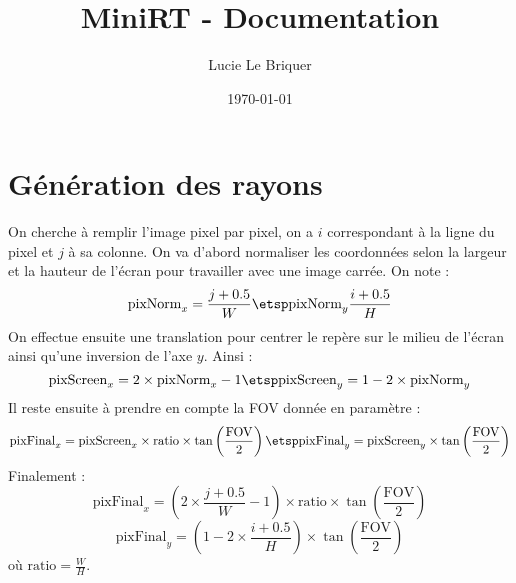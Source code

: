 

\title{\LARGE \textbf{MiniRT} - Documentation}
\author{\large Lucie Le Briquer}
\date{\today}


\maketitle
\tableofcontents
\newpage\section{Génération des rayons}
\begin{center}
\hspace{1cm}
\end{center}
\dd\ni On cherche à remplir l'image pixel par pixel, on a $i$ correspondant à la
ligne du pixel et $j$ à sa colonne. On va d'abord normaliser les coordonnées
selon la largeur et la hauteur de l'écran pour travailler avec une image carrée.
On note :
$$\text{pixNorm}_x=\frac{j + 0.5} W \etsp\text{pixNorm}_y\frac{i + 0.5} H$$
\ni On effectue ensuite une translation pour centrer le repère sur le milieu de
l'écran ainsi qu'une inversion de l'axe $y$. Ainsi :
$$\text{pixScreen}_x=2 \times\text{pixNorm}_x -1 \etsp \text{pixScreen}_y = 1 -
2\times \text{pixNorm}_y$$
\ni Il reste ensuite à prendre en compte la FOV donnée en paramètre :
$$\text{pixFinal}_x = \text{pixScreen}_x \times \text{ratio}
\times\tan\left(\frac{\text{FOV}} 2\right)\etsp \text{pixFinal}_y = 
\text{pixScreen}_y \times\tan\left(\frac{\text{FOV}} 2\right)$$
\ni Finalement :
$$\text{pixFinal}_x = \left(2\times \frac{j+0.5}{W}- 1\right)
\times \text{ratio}\times\tan\left(\frac{\text{FOV}} 2\right)$$
$$\text{pixFinal}_y = \left(1 - 2\times \frac{i+0.5}{H}\right)
\times\tan\left(\frac{\text{FOV}} 2\right)$$
\ni où $\text{ratio} = \frac W H$.


